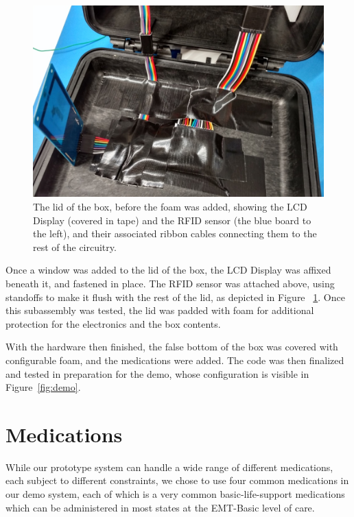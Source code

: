 \documentclass{sigchi}
\begin{document}
\begin{figure}[!ht]
\centering
\includegraphics[width=\columnwidth]{box_lid}
\caption{The lid of the box, before the foam was added, showing the LCD Display
	(covered in tape) and the RFID sensor (the blue board to the left), and their
    associated ribbon cables connecting them to the rest of the circuitry.}
\label{fig:lid}
\end{figure}

Once a window was added to the lid of the box, the LCD Display was affixed beneath
it, and fastened in place. The RFID sensor was attached above, using standoffs to
make it flush with the rest of the lid, as depicted in Figure ~\ref{fig:lid}.
Once this subassembly was tested, the lid was padded with foam for additional
protection for the electronics and the box contents.

With the hardware then finished, the false bottom of the box was covered with
configurable foam, and the medications were added. The code was then finalized
and tested in preparation for the demo, whose configuration is visible in
Figure~\ref{fig:demo}.


\section{Medications} \label{meds}
While our prototype system can handle a wide range of different medications, each
subject to different constraints, we chose to use four common medications in our
demo system, each of which is a very common basic-life-support medications which can
be administered in most states at the EMT-Basic level of care.
\end{document}
